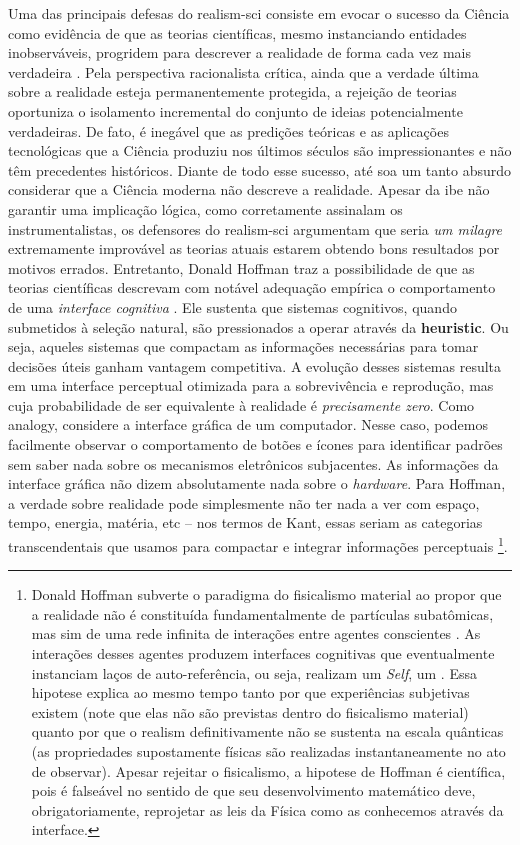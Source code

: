 \documentclass[./main.tex]{subfiles}
\begin{document}
\par Uma das principais defesas do \gls{realism-sci} consiste em evocar o sucesso da Ciência como evidência de que as teorias científicas, mesmo instanciando entidades inobserváveis, progridem para descrever a realidade de forma cada vez mais verdadeira \cite{saatsi2017}. Pela perspectiva racionalista crítica, ainda que a verdade última sobre a realidade esteja permanentemente protegida, a rejeição de teorias oportuniza o isolamento incremental do conjunto de ideias potencialmente verdadeiras. De fato, é inegável que as predições teóricas e as aplicações tecnológicas que a Ciência produziu nos últimos séculos são impressionantes e não têm precedentes históricos. Diante de todo esse sucesso, até soa um tanto absurdo considerar que a Ciência moderna não descreve a realidade. Apesar da \gls{ibe} não garantir uma implicação lógica, como corretamente assinalam os instrumentalistas, os defensores do \gls{realism-sci} argumentam que seria \textit{um milagre} extremamente improvável as teorias atuais estarem obtendo bons resultados por motivos errados. Entretanto, Donald Hoffman traz a possibilidade de que as teorias científicas descrevam com notável adequação empírica o comportamento de uma \textit{interface cognitiva} \cite{Hoffman2015}. Ele sustenta que sistemas cognitivos, quando submetidos à seleção natural, são pressionados a operar através da \textbf{\gls{heuristic}}. Ou seja, aqueles sistemas que compactam as informações necessárias para tomar decisões úteis ganham vantagem competitiva. A evolução desses sistemas resulta em uma interface perceptual otimizada para a sobrevivência e reprodução, mas cuja probabilidade de ser equivalente à realidade é \textit{precisamente zero}. Como \gls{analogy}, considere a interface gráfica de um computador. Nesse caso, podemos facilmente observar o comportamento de botões e ícones para identificar padrões sem saber nada sobre os mecanismos eletrônicos subjacentes. As informações da interface gráfica não dizem absolutamente nada sobre o \textit{hardware}.  Para Hoffman, a verdade sobre realidade pode simplesmente não ter nada a ver com espaço, tempo, energia, matéria, etc -- nos termos de Kant, essas seriam as categorias transcendentais que usamos para compactar e integrar informações perceptuais \footnote{Donald Hoffman subverte o \gls{paradigma} do fisicalismo material ao propor que a realidade não é constituída fundamentalmente de partículas subatômicas, mas sim de uma rede infinita de interações entre agentes conscientes \cite{Hoffman2023}. As interações desses agentes produzem interfaces cognitivas que eventualmente instanciam laços de auto-referência, ou seja, realizam um \textit{Self}, um . Essa \gls{hipotese} explica ao mesmo tempo tanto por que experiências subjetivas existem (note que elas não são previstas dentro do fisicalismo material) quanto por que o \gls{realism} definitivamente não se sustenta na escala quânticas (as propriedades supostamente físicas são realizadas instantaneamente no ato de observar). Apesar rejeitar o fisicalismo, a \gls{hipotese} de Hoffman é científica, pois é falseável no sentido de que seu desenvolvimento matemático deve, obrigatoriamente, reprojetar as leis da Física como as conhecemos através da interface.}.  
\end{document}
